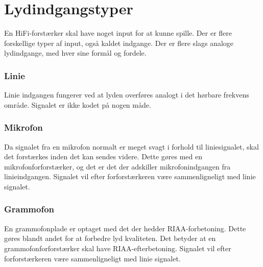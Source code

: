 \section{Lydindgangstyper}
\label{indgange}
En HiFi-forstærker skal have noget input for at kunne spille. Der er flere forskellige typer af input, også kaldet indgange. Der er flere slags analoge lydindgange, med hver sine formål og fordele.

\subsubsection{Linie}
Linie indgangen fungerer ved at lyden overføres analogt i det hørbare frekvens område. Signalet er ikke kodet på nogen måde. 

\subsubsection{Mikrofon}
Da signalet fra en mikrofon normalt er meget svagt i forhold til liniesignalet, skal det forstærkes inden det kan sendes videre. Dette gøres med en mikrofonforforstærker, og det er det der adskiller mikrofonindgangen fra linieindgangen. Signalet vil efter forforstærkeren være sammenligneligt med linie signalet.

\subsubsection{Grammofon}
En grammofonplade er optaget med det der hedder RIAA-forbetoning. Dette gøres blandt andet for at forbedre lyd kvaliteten. Det betyder at en grammofonforforstærker skal have RIAA-efterbetoning. Signalet vil efter forforstærkeren være sammenligneligt med linie signalet. 


